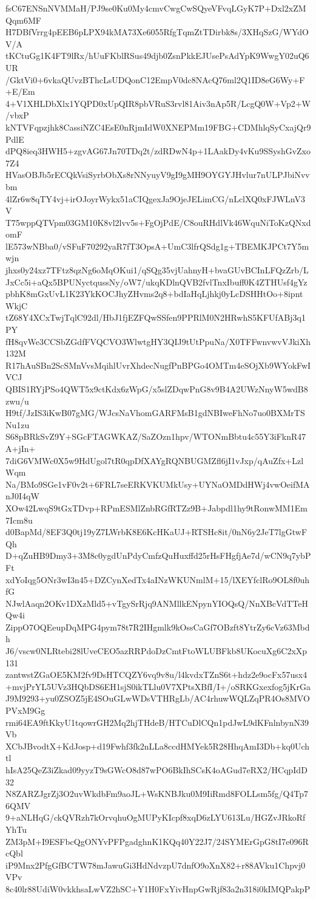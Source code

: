 fsC67ENSnNVMMaH/PJ9se0Ku0My4cmvCwgCwSQyeVFvqLGyK7P+Dxl2xZMQqm6MF
H7DBfVrrg4pEEB6pLPX94kMA73Xe6055RfgTqmZtTDirbk8s/3XHqSzG/WYdOV/A
tKCtuGg1K4FT9lRx/hUuFKblRSus49djb0ZsnPkkEJUsePsAdYpK9WwgY02uQ6UR
/GktVi0+6vkaQUvzBThcLsUDQonC12EmpV0dc8NAcQ76ml2Q1ID8eG6Wy+F+E/Em
4+V1XHLDbXlx1YQPD0xUpQIR8pbVRuS3rvl81Aiv3nAp5R/LcgQ0W+Vp2+W/vbxP
kNTVFqpzjhk8CassiNZC4EsE0nRjmIdW0XNEPMm19FBG+CDMhlqSyCxajQr9PdlE
dPQ8ieq3HWH5+zgvAG67Jn70TDq2t/zdRDwN4p+1LAakDy4vKu9SSyshGvZxo7Z4
HVasOBJb5rECQkVsiSyrbObXs8rNNyuyV9gI9gMH9OYGYJHvlur7nULPJbiNvvbm
4lZr6w8qTY4vj+irOJoyrWykx51aCIQgexJa9OjeJELimCG/nLclXQ0xFJWLnV3V
T75wppQTVpm03GM10K8vl2lvv5s+FgOjPdE/C8ouRHdlVk46WquNiToKzQNxdomF
lE573wNBba0/vSFuF70292yaR7fT3OpsA+UmC3lfrQSdg1g+TBEMKJPCt7Y5mwjn
jhxs0y24xz7TFtz8qzNg6oMqOKui1/qSQg35vjUahnyH+bvaGUvBCInLFQzZrb/L
JxCc5i+aQx5BPUNyctqussNy/oW7/ukqKDlnQVB2fvlTnxIbuff0K4ZTHUsf4gYz
pbhK8mGxUvL1K23YkKOCJhyZHvms2q8+bdIaHqLjhkj0yLcDSHHtOo+8ipntWkjC
tZ68Y4XCxTwjTqlC92dl/HbJ1fjEZFQwSSfen9PPRlM0N2HRwhS5KFUfABj3q1PY
fH8qvWe3CCSbZGdfFVQCVO3WlwtgHY3QIJ9tUtPpuNa/X0TFFwnvwvVJkiXh132M
R17hAuSBn2ScSMnVvsMqihlUvrXhdecNugfPnBPGo4OMTm4eSOjXb9WYokFwIVCJ
QBIS1RYjPSo4QWT5x9ctKdx6zWpG/x5slZDqwPnG8v9B4A2UWzNnyW5wdB8zwu/u
H9tf/JzIS3iKwB07gMG/WJcsNaVhomGARFMsB1gdNBIweFhNo7uo0BXMrTSNu1zu
S68pBRkSvZ9Y+SGcFTAGWKAZ/SaZOzn1hpv/WTONmBbtu4c55Y3iFknR47A+jIn+
7diG6VMWc0X5w9HdUgol7tR0qpDfXAYgRQNBUGMZfl6jI1vJxp/qAuZfx+LzlWqm
Na/BMo9SGe1vF0v2t+6FRL7seERKVKUMkUsy+UYNaOMDdHWj4vwOeifMAnJ0I4qW
XOw42LwqS9tGxTDvp+RPmESMlZnbRGfRTZz9B+Jabpdl1hy9tRonwMM1Em7Icm8u
d0BapMd/8EF3Q0tj19yZ7LWrbK8E6KcHKaUJ+RTSHc8it/0nN6y2JeT7lgGtwFQh
D+qZuHB9Dmy3+3M8c0ygdUnPdyCmfzQuHuxffd25rHsFHgfjAe7d/wCN9q7ybPFt
xdYoIqg5ONr3wI3n45+DZCynXedTx4aINzWKUNmlM+15/lXEYfclRo9OL8f0uhfG
NJwlAaqn2OKv1DXzMld5+vTgySrRjq9ANMllkENpynYIOQsQ/NnXBcVdTTeHQw4i
ZippO7OQEeupDqMPG4pym78t7R2IHgmlk9kOssCaGf7OBzft8YtrZy6cVz63Mbdh
J6/vscw0NLRtebi28lUveCEO5azRRPdoDzCmtFtoWLUBFkb8UKocuXg6C2xXp131
zantwstZGaOE5KM2fv9DsHTCQZY6vq9v8u/l4kvdxTZnS6t+hdz2e9ocFx57usx4
+mvjPrYL5UVz3HQbDS6EH1sjS0ikTLlu0V7XPtsXBfI/I+/oSRKGxexfog5jKrGa
J9M9293+yu0ZSOZ5jE4SOuGLwWDsVTHRgLb/AC4rhuwWQLZqPR4Os8MVOPVxM9Gg
rmi64EA9ftKkyU1tqowrGH2Mq2hjTHdeB/HTCuDlCQn1pdJwL9dKFnlnbynN39Vb
XCbJBvodtX+KdJosp+d19Fwhf3fk2nLLa8ccdHMYek5R28HhqAmI3Db+kq0Uchtl
hIsA25QeZ3iZkad09yyzT9sGWcO8d87wPO6BkIhSCsK4oAGud7eRX2/HCqpIdD32
N8ZARZJgrZj3O2uvWkdbFm9aoJL+WsKNBJku0M9IiRmd8FOLLsm5fg/Q4Tp76QMV
9+aNLHqG/ckQVRzh7kOrvqhuOgMUPyKIcpf8xqD6zLYU613Lu/HGZvJRkoRfYhTu
ZM3pM+I9ESFbcQgONYvPFPgadghnK1KQq40Y22J7/24SYMErGpG8tI7e096RcQbl
iP9Mnx2PfgGfBCTW78mJawuGi3HdNdvzpU7dnfO9oXnX82+r88AVku1Chpvj0VPv
8c40lr88UdiW0vkkhsaLwVZ2hSC+Y1H0FxYivHnpGwRjf83a2n318i0kIMQPakpP
